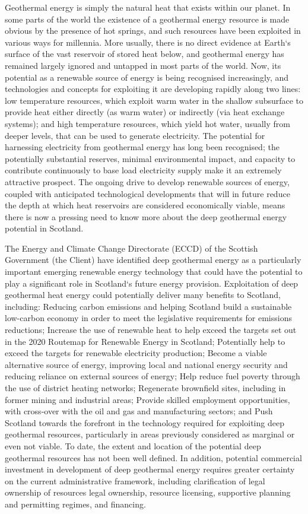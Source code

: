 Geothermal energy is simply the natural heat that exists within our planet. In some parts of the
world the existence of a geothermal energy resource is made obvious by the presence of hot
springs, and such resources have been exploited in various ways for millennia. More usually,
there is no direct evidence at Earth‘s surface of the vast reservoir of stored heat below, and
geothermal energy has remained largely ignored and untapped in most parts of the world. Now,
its potential as a renewable source of energy is being recognised increasingly, and technologies
and concepts for exploiting it are developing rapidly along two lines: low temperature resources,
which exploit warm water in the shallow subsurface to provide heat either directly (as warm
water) or indirectly (via heat exchange systems); and high temperature resources, which yield
hot water, usually from deeper levels, that can be used to generate electricity.
The potential for harnessing electricity from geothermal energy has long been recognised; the
potentially substantial reserves, minimal environmental impact, and capacity to contribute
continuously to base load electricity supply make it an extremely attractive prospect. The
ongoing drive to develop renewable sources of energy, coupled with anticipated technological
developments that will in future reduce the depth at which heat reservoirs are considered
economically viable, means there is now a pressing need to know more about the deep
geothermal energy potential in Scotland.






The Energy and Climate Change Directorate (ECCD) of the Scottish Government (the Client)
have identified deep geothermal energy as a particularly important emerging renewable energy
technology that could have the potential to play a significant role in Scotland‘s future energy
provision.
Exploitation of deep geothermal heat energy could potentially deliver many benefits to Scotland,
including:
Reducing carbon emissions and helping Scotland build a sustainable low-carbon economy
in order to meet the legislative requirements for emissions reductions;
Increase the use of renewable heat to help exceed the targets set out in the 2020
Routemap for Renewable Energy in Scotland;
Potentially help to exceed the targets for renewable electricity production;
Become a viable alternative source of energy, improving local and national energy security
and reducing reliance on external sources of energy;
Help reduce fuel poverty through the use of district heating networks;
Regenerate brownfield sites, including in former mining and industrial areas;
Provide skilled employment opportunities, with cross-over with the oil and gas and
manufacturing sectors; and
Push Scotland towards the forefront in the technology required for exploiting deep
geothermal resources, particularly in areas previously considered as marginal or even not
viable.
To date, the extent and location of the potential deep geothermal resources has not been well
defined. In addition, potential commercial investment in development of deep geothermal energy
requires greater certainty on the current administrative framework, including clarification of legal
ownership of resources legal ownership, resource licensing, supportive planning and permitting
regimes, and financing.
